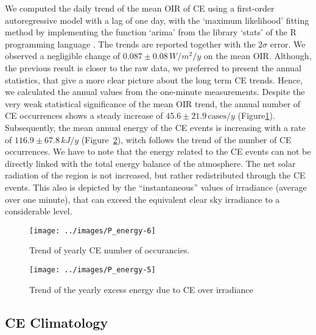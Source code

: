 \documentclass[preprint, 3p,
authoryear]{elsarticle} %
\begin{document}
We computed the daily trend of the mean OIR of CE using a first-order
autoregressive model with a lag of one day, with the `maximum
likelihood' fitting method \citep{Gardner1980, Jones1980} by
implementing the function `arima' from the library `stats' of the R
programming language \citep{RCT2023}. The trends are reported together
with the \(2\sigma\) error. We observed a negligible change of
\(0.087\pm 0.08\,W/m^2/y\) on the mean OIR. Although, the previous
result is closer to the raw data, we preferred to present the annual
statistics, that give a more clear picture about the long term CE
trends. Hence, we calculated the annual values from the one-minute
measurements. Despite the very weak statistical significance of the mean
OIR trend, the annual number of CE occurrences shows a steady increase
of \(45.6\pm 21.9\,\text{cases}/y\)
(Figure\nobreakspace{}\ref{fig:P-energy-N}). Subsequently, the mean
annual energy of the CE events is increasing with a rate of
\(116.9\pm 67.8\,kJ/y\) (Figure~\ref{fig:P-energy-sum}), witch follows
the trend of the number of CE occurrences. We have to note that the
energy related to the CE events can not be directly linked with the
total energy balance of the atmosphere. The net solar radiation of the
region is not increased, but rather redistributed through the CE events.
This also is depicted by the ``instantaneous'' values of irradiance
(average over one minute), that can exceed the equivalent clear sky
irradiance to a considerable level.

\begin{figure}

{\centering \texttt{[image: ../images/P\_energy-6]} 

}

\caption{Trend of yearly CE number of occurancies.}\label{fig:P-energy-N}
\end{figure}

\begin{figure}

{\centering \texttt{[image: ../images/P\_energy-5]} 

}

\caption{Trend of the yearly excess energy due to CE over irradiance}\label{fig:P-energy-sum}
\end{figure}

\hypertarget{ce-climatology}{%
\subsection{CE Climatology}\label{ce-climatology}}
\end{document}
